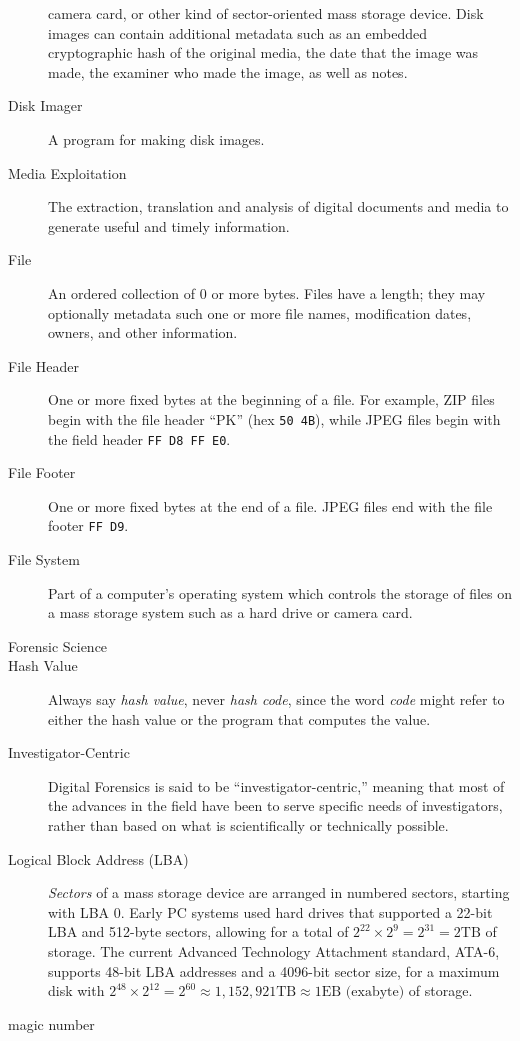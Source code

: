 \begin{description}
  camera card, or other kind of sector-oriented mass storage
  device. Disk images can contain additional metadata such as an
  embedded cryptographic hash of the original media, the date that the
  image was made, the examiner who made the image, as well as notes.
\item[Disk Imager] A program for making disk images.
\item[Media Exploitation] The extraction, translation and
  analysis of digital documents and media to generate
  useful and timely information.
\item[File] An ordered collection of 0 or more bytes. Files have a
  length; they may optionally metadata such one or more file names,
  modification dates, owners, and other information.
\item[File Header] One or more fixed bytes at the beginning of a
  file. For example, ZIP files begin with the file header ``PK'' (hex
  \texttt{50 4B}), while JPEG files begin with the field header
  \texttt{FF D8 FF E0}.
\item[File Footer] One or more fixed bytes at the end of a file. JPEG
  files end with the file footer \texttt{FF D9}.
\item[File System] Part of a computer's operating system which
  controls the storage of files on a mass storage system such as a
  hard drive or camera card.
\item[Forensic Science]
\item[Hash Value] Always say \emph{hash value}, never \emph{hash
  code}, since the word \emph{code} might refer to either the hash
  value or the program that computes the value.
\item[Investigator-Centric] Digital Forensics is said to be
  ``investigator-centric,'' meaning that most of the advances in the
  field have been to serve specific needs of investigators, rather
  than based on what is scientifically or technically possible.
\item[Logical Block Address (LBA)] \emph{Sectors} of a mass storage
  device are arranged in numbered sectors, starting with LBA 0. Early
  PC systems used hard drives that supported a 22-bit LBA and 512-byte sectors, allowing for a
  total of $2^{22}\times 2^{9}=2^{31}=2\textrm{TB}$ of storage. The
  current Advanced Technology Attachment standard, ATA-6, supports
  48-bit LBA addresses and a 4096-bit sector size, for a maximum disk
  with $2^{48}\times 2^{12}=2^{60}\approx 1,152,921\textrm{TB} \approx 1
  \textrm{EB (exabyte)}$ of storage.
\item[magic number]

\end{description}
